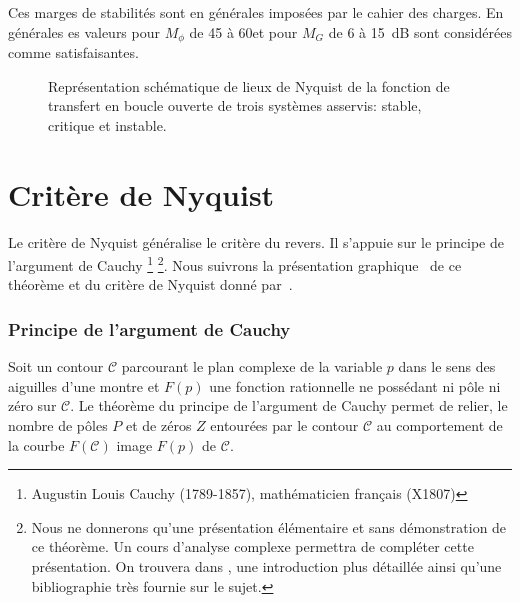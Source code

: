 Ces marges de stabilités sont en générales imposées par le cahier des charges.
En générales es valeurs pour $M_{\phi}$ de 45 à 60\degree et
pour $M_G$ de 6 à 15~\si{\dB} sont considérées comme satisfaisantes.
\begin{figure}[!h]
    \centering
    
    \caption{Représentation schématique de lieux de Nyquist de la fonction 
             de transfert en boucle ouverte de trois systèmes asservis: 
             stable, critique et instable. \label{fig-nyquist_revers}}
\end{figure}
\section{Critère de Nyquist}
Le critère de Nyquist généralise le critère du revers.
Il s'appuie sur le principe de l'argument de Cauchy
\footnote{Augustin Louis Cauchy (1789-1857), mathématicien français (X1807)}
\footnote{Nous ne donnerons qu'une présentation élémentaire et sans 
démonstration de ce théorème. Un cours d'analyse complexe permettra de 
compléter cette présentation. On trouvera dans \cite{laas_pc7bis,reg}, 
une introduction plus détaillée ainsi qu'une bibliographie très fournie 
sur le sujet.}. Nous suivrons la présentation \og graphique\fg~ de ce théorème 
et du critère de Nyquist donné par~\cite{reg}. 
\subsubsection{Principe de l'argument de Cauchy}
Soit un contour $\mathcal{C}$ parcourant le plan complexe de 
la variable $p$ dans le sens des aiguilles d'une montre et $F(p)$ une fonction 
rationnelle ne possédant ni pôle ni zéro sur $\mathcal{C}$. Le théorème du 
principe de l'argument de Cauchy permet de relier, le nombre de pôles $P$ et 
de zéros $Z$ entourées par le contour $\mathcal{C}$ au comportement de la 
courbe $F(\mathcal{C})$ image $F(p)$ de $\mathcal{C}$.

